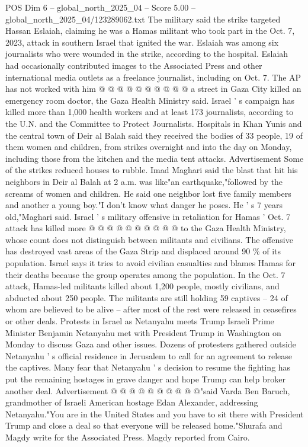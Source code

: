 \begin{textsample}{POS Dim 6 – global\_north\_2025\_04 – Score 5.00 – global\_north\_2025\_04/123289062.txt}
The military said the strike targeted Hassan Eslaiah, claiming he was a Hamas militant who took part in the Oct. 7, 2023, attack in southern Israel that ignited the war.
Eslaiah was among six journalists who were wounded in the strike, according to the hospital.
Eslaiah had occasionally contributed images to the Associated Press and other international media outlets as a freelance journalist, including on Oct. 7.
The AP has not worked with him @ @ @ @ @ @ @ @ @ @ a street in Gaza City killed an emergency room doctor, the Gaza Health Ministry said.
Israel ' s campaign has killed more than 1,000 health workers and at least 173 journalists, according to the U.N. and the Committee to Protect Journalists.
Hospitals in Khan Yunis and the central town of Deir al Balah said they received the bodies of 33 people, 19 of them women and children, from strikes overnight and into the day on Monday, including those from the kitchen and the media tent attacks.
Advertisement Some of the strikes reduced houses to rubble.
Imad Maghari said the blast that hit his neighbors in Deir al Balah at 2 a.m. was like"an earthquake,"followed by the screams of women and children.
He said one neighbor lost five family members and another a young boy."I don't know what danger he poses.
He ' s 7 years old,"Maghari said.
Israel ' s military offensive in retaliation for Hamas ' Oct. 7 attack has killed more @ @ @ @ @ @ @ @ @ @ to the Gaza Health Ministry, whose count does not distinguish between militants and civilians.
The offensive has destroyed vast areas of the Gaza Strip and displaced around 90 \% of its population.
Israel says it tries to avoid civilian casualties and blames Hamas for their deaths because the group operates among the population.
In the Oct. 7 attack, Hamas-led militants killed about 1,200 people, mostly civilians, and abducted about 250 people.
The militants are still holding 59 captives -- 24 of whom are believed to be alive -- after most of the rest were released in ceasefires or other deals.
Protests in Israel as Netanyahu meets Trump Israeli Prime Minister Benjamin Netanyahu met with President Trump in Washington on Monday to discuss Gaza and other issues.
Dozens of protesters gathered outside Netanyahu ' s official residence in Jerusalem to call for an agreement to release the captives.
Many fear that Netanyahu ' s decision to resume the fighting has put the remaining hostages in grave danger and hope Trump can help broker another deal.
Advertisement @ @ @ @ @ @ @ @ @ @"said Varda Ben Baruch, grandmother of Israeli American hostage Edan Alexander, addressing Netanyahu."You are in the United States and you have to sit there with President Trump and close a deal so that everyone will be released home."Shurafa and Magdy write for the Associated Press.
Magdy reported from Cairo.

\end{textsample}
